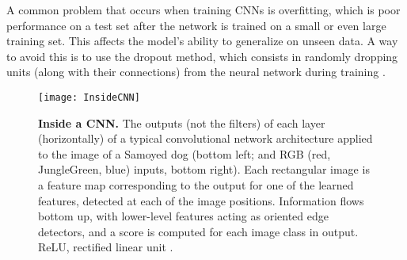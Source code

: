 A common problem that occurs when training CNNs is overfitting, which
is poor performance on a test set after the network is trained on
a small or even large training set. This affects the model’s ability
to generalize on unseen data. A way to avoid this is to use the dropout
method, which consists in randomly dropping units (along with their
connections) from the neural network during training \citep{Srivastava2014}.


\begin{figure}
	\centering
	\texttt{[image: InsideCNN]}
	\caption[Inside a CNN]
	{\textbf{Inside a CNN.} The outputs (not the filters) of each layer
  (horizontally) of a typical convolutional network architecture applied to
  the image of a Samoyed dog (bottom left; and RGB (red, JungleGreen, blue) inputs,
  bottom right). Each rectangular image is a feature map corresponding to the
  output for one of the learned features, detected at each of the image
  positions. Information flows bottom up, with lower-level features acting
  as oriented edge detectors, and a score is computed for each image class in
  output. ReLU, rectified linear unit \citep{LeCun2015}.}
  \label{fig:InsideCNN}
\end{figure}
